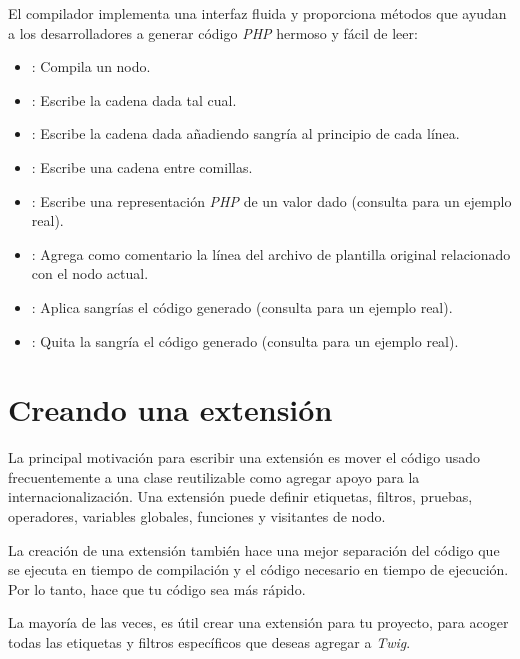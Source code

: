\documentclass[letterpaper,10pt,spanish]{sphinxmanual}
\begin{document}
El compilador implementa una interfaz fluida y proporciona métodos que ayudan a los desarrolladores a generar código \emph{PHP} hermoso y fácil de leer:
\begin{itemize}
\item {} 
: Compila un nodo.

\item {} 
: Escribe la cadena dada tal cual.

\item {} 
: Escribe la cadena dada añadiendo sangría al principio de cada línea.

\item {} 
: Escribe una cadena entre comillas.

\item {} 
: Escribe una representación \emph{PHP} de un valor dado (consulta  para un ejemplo real).

\item {} 
: Agrega como comentario la línea del archivo de plantilla original relacionado con el nodo actual.

\item {} 
: Aplica sangrías el código generado (consulta  para un ejemplo real).

\item {} 
: Quita la sangría el código generado (consulta  para un ejemplo real).

\end{itemize}


\chapter{Creando una extensión}
\label{advanced:creando-una-extension}\label{advanced:creating-extensions}
La principal motivación para escribir una extensión es mover el código usado frecuentemente a una clase reutilizable como agregar apoyo para la internacionalización. Una extensión puede definir etiquetas, filtros, pruebas, operadores, variables globales, funciones y visitantes de nodo.

La creación de una extensión también hace una mejor separación del código que se ejecuta en tiempo de compilación y el código necesario en tiempo de ejecución. Por lo tanto, hace que tu código sea más rápido.

La mayoría de las veces, es útil crear una extensión para tu proyecto, para acoger todas las etiquetas y filtros específicos que deseas agregar a \emph{Twig}.
\end{document}
